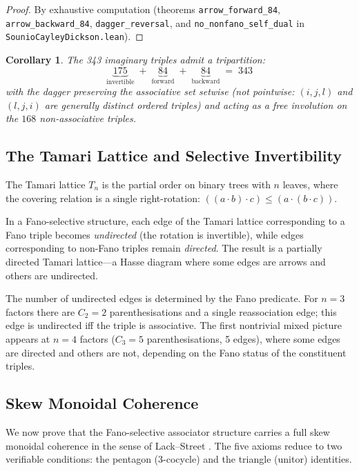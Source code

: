 \documentclass[11pt,a4paper]{article}
\newtheorem{corollary}[theorem]{Corollary}
\theoremstyle{definition}
\theoremstyle{remark}
\begin{document}
\begin{proof}
By exhaustive computation (theorems \texttt{arrow\_forward\_84},
\texttt{arrow\_backward\_84}, \texttt{dagger\_reversal}, and
\texttt{no\_nonfano\_self\_dual} in \texttt{SounioCayleyDickson.lean}).
\end{proof}

\begin{corollary}\label{cor:tripartition}
The 343 imaginary triples admit a tripartition:
\[
  \underbrace{175}_{\text{invertible}} \;+\;
  \underbrace{84}_{\text{forward}} \;+\;
  \underbrace{84}_{\text{backward}} \;=\; 343
\]
with the dagger preserving the associative set \emph{setwise}
(not pointwise: $(i,j,l)$ and $(l,j,i)$ are generally distinct
ordered triples) and acting as a free involution on the $168$
non-associative triples.
\end{corollary}

\subsection{The Tamari Lattice and Selective Invertibility}

The Tamari lattice $T_n$ \cite{tamari1962} is the partial order on
binary trees with $n$ leaves, where the covering relation is a single
right-rotation: $((a \cdot b) \cdot c) \leq (a \cdot (b \cdot c))$.

In a Fano-selective structure, each edge of the Tamari lattice
corresponding to a Fano triple becomes \emph{undirected} (the rotation
is invertible), while edges corresponding to non-Fano triples remain
\emph{directed}. The result is a partially directed Tamari lattice---a
Hasse diagram where some edges are arrows and others are undirected.

The number of undirected edges is determined by the Fano predicate.
For $n = 3$ factors there are $C_2 = 2$ parenthesisations and a
single reassociation edge; this edge is undirected iff the triple
is associative. The first nontrivial mixed picture appears at $n = 4$
factors ($C_3 = 5$ parenthesisations, 5 edges), where some edges are
directed and others are not, depending on the Fano status of the
constituent triples.

\subsection{Skew Monoidal Coherence}\label{sec:coherence}

We now prove that the Fano-selective associator structure carries a
full skew monoidal coherence in the sense of Lack--Street
\cite{lackstreet2012}. The five axioms reduce to two verifiable
conditions: the pentagon (3-cocycle) and the triangle (unitor)
identities.
\end{document}

